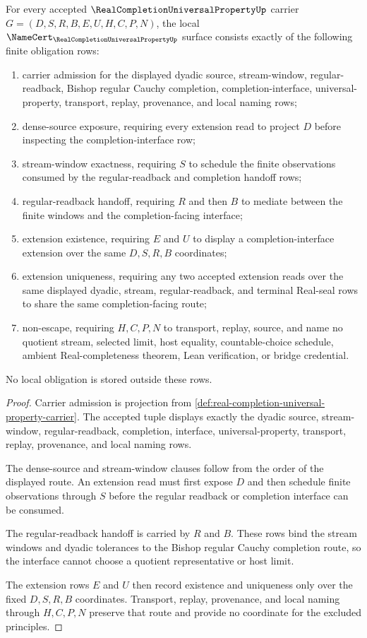 \begin{theorem}
\label{thm:real-completion-universal-property-namecert-obligations}
For every accepted $\RealCompletionUniversalPropertyUp$ carrier $G=(D,S,R,B,E,U,H,C,P,N)$, the local $\NameCert_{\RealCompletionUniversalPropertyUp}$ surface consists exactly of the following finite obligation rows:
\begin{enumerate}
\item carrier admission for the displayed dyadic source, stream-window, regular-readback, Bishop regular Cauchy completion, completion-interface, universal-property, transport, replay, provenance, and local naming rows;
\item dense-source exposure, requiring every extension read to project $D$ before inspecting the completion-interface row;
\item stream-window exactness, requiring $S$ to schedule the finite observations consumed by the regular-readback and completion handoff rows;
\item regular-readback handoff, requiring $R$ and then $B$ to mediate between the finite windows and the completion-facing interface;
\item extension existence, requiring $E$ and $U$ to display a completion-interface extension over the same $D,S,R,B$ coordinates;
\item extension uniqueness, requiring any two accepted extension reads over the same displayed dyadic, stream, regular-readback, and terminal Real-seal rows to share the same completion-facing route;
\item non-escape, requiring $H,C,P,N$ to transport, replay, source, and name no quotient stream, selected limit, host equality, countable-choice schedule, ambient Real-completeness theorem, Lean verification, or bridge credential.
\end{enumerate}
No local obligation is stored outside these rows.
\end{theorem}
\begin{proof}
Carrier admission is projection from \autoref{def:real-completion-universal-property-carrier}. The accepted tuple displays exactly the dyadic source, stream-window, regular-readback, completion, interface, universal-property, transport, replay, provenance, and local naming rows.

The dense-source and stream-window clauses follow from the order of the displayed route. An extension read must first expose $D$ and then schedule finite observations through $S$ before the regular readback or completion interface can be consumed.

The regular-readback handoff is carried by $R$ and $B$. These rows bind the stream windows and dyadic tolerances to the Bishop regular Cauchy completion route, so the interface cannot choose a quotient representative or host limit.

The extension rows $E$ and $U$ then record existence and uniqueness only over the fixed $D,S,R,B$ coordinates. Transport, replay, provenance, and local naming through $H,C,P,N$ preserve that route and provide no coordinate for the excluded principles.
\end{proof}

